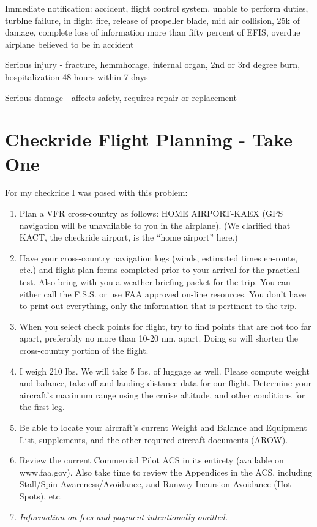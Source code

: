 Immediate notification: accident, flight control system, unable to perform duties, turblne failure, in flight fire, release of propeller blade, mid air collision, 25k of damage, complete loss of information more than fifty percent of EFIS, overdue airplane believed to be in accident

Serious injury - fracture, hemmhorage, internal organ, 2nd or 3rd degree burn, hospitalization 48 hours within 7 days

Serious damage - affects safety, requires repair or replacement

\section{Checkride Flight Planning - Take One}

For my checkride I was posed with this problem:

\begin{enumerate}

\item Plan a VFR cross-country as follows: HOME AIRPORT-KAEX (GPS navigation will be unavailable to you in the airplane). (We clarified that KACT, the checkride airport, is the ``home airport'' here.)

\item Have your cross-country navigation logs (winds, estimated times en-route, etc.) and flight plan forms completed prior to your arrival for the practical test. Also bring with you a weather briefing packet for the trip. You can either call the F.S.S. or use FAA approved on-line resources. You don't have to print out everything, only the information that is pertinent to the trip.

\item When you select check points for flight, try to find points that are not too far apart, preferably no more than 10-20 nm. apart. Doing so will shorten the cross-country portion of the flight.

\item I weigh 210 lbs. We will take 5 lbs. of luggage as well. Please compute weight and balance, take-off and landing distance data for our flight. Determine your aircraft's maximum range using the cruise altitude, and other conditions for the first leg.

\item Be able to locate your aircraft's current Weight and Balance and Equipment List, supplements, and the other required aircraft documents (AROW).

\item Review the current Commercial Pilot ACS in its entirety (available on www.faa.gov). Also take time to review the Appendices in the ACS, including Stall/Spin Awareness/Avoidance, and Runway Incursion Avoidance (Hot Spots), etc.

\item \emph{Information on fees and payment intentionally omitted.}

\end{enumerate}

